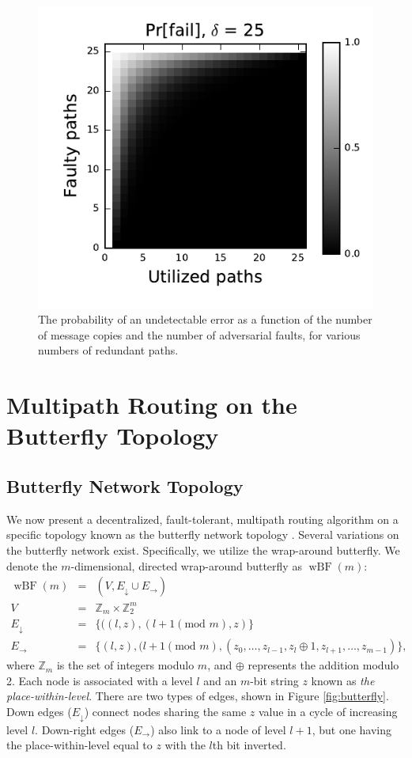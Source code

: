 \documentclass{sig-alternate-05-2015}
\newcommand{\beq}{\begin{eqnarray}}
\newcommand{\eeq}{\end{eqnarray}}
\DeclareMathOperator{\wbf}{wBF}
\begin{document}
\begin{figure}
\centerline{\includegraphics{fig-perror}}
\caption{
The probability of an undetectable error as a function of the number of
message copies and the number of adversarial faults,
for various numbers of redundant paths.
}
\label{fig:pfail}
\end{figure}

\section{Multipath Routing on the Butterfly Topology}

\subsection{Butterfly Network Topology}

We now present a decentralized, fault-tolerant, multipath routing algorithm
on a specific topology known as the butterfly network topology
\cite{kshemkalyani_distributed_2008}.
Several variations on the butterfly network exist.
Specifically, we utilize the wrap-around butterfly.
We denote the $m$-dimensional, directed wrap-around butterfly as $\wbf(m)$:
\beq
\wbf(m) &=& (V, E_\downarrow \cup E_\rightarrow) \\
V &=& \mathbb{Z}_{m} \times \mathbb{Z}_2^m \\
E_\downarrow
&=&
\{((l,z),(l+1 (\text{mod } m),z) \} \\
E_\rightarrow
&=&
\{(l,z),(l+1 (\text{mod } m),
(z_0, \ldots, z_{l-1},z_l \oplus 1, z_{l+1}, \ldots, z_{m-1}) \},
\eeq
where $\mathbb{Z}_m$ is the set of integers modulo $m$,
and $\oplus$ represents the addition modulo 2.
Each node is associated with a level $l$ and an $m$-bit string $z$
known as {\em the place-within-level}.
There are two types of edges, shown in Figure \ref{fig:butterfly}.
Down edges ($E_\downarrow$) connect nodes sharing the same $z$ value
in a cycle of increasing level $l$.
Down-right edges ($E_\rightarrow$) also link to a node of level $l + 1$,
but one having the place-within-level equal to $z$ with the $l$th bit inverted.
\end{document}
